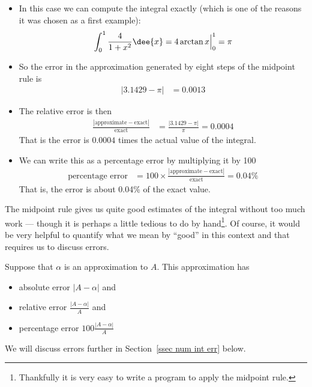 \begin{eg}
\begin{itemize}
\item In this case we can compute the integral exactly (which is one of the reasons it
was chosen as a first example):
\begin{align*}
\int_0^1\frac{4}{1+x^2}\dee{x} =4\arctan x\Big|_0^1 = \pi
\end{align*}

\item So the error in the approximation generated by eight steps of the midpoint
rule is
\begin{align*}
|3.1429-\pi| &=0.0013
\end{align*}
\item The relative error is then
\begin{align*}
  \frac{|\text{approximate}-\text{exact}|}{\text{exact}}
  &= \frac{|3.1429-\pi|}{\pi}=0.0004
\end{align*}
That is the error is $0.0004$ times the actual value of the integral.
\item We can write this as a percentage error by multiplying it by 100
\begin{align*}
  \text{percentage error} &= 100 \times
\frac{|\text{approximate}-\text{exact}|}{\text{exact}}
  = 0.04 \%
\end{align*}
That is, the error is about 0.04\% of the exact value.
\end{itemize}

\end{eg}
The midpoint rule gives us quite good estimates of the integral without too much work
--- though it is perhaps a little tedious to do by hand\footnote{Thankfully it is very
easy to write a program to apply the midpoint rule.}. Of course, it would be very helpful
to quantify what we mean by ``good'' in this context and that requires us to discuss
errors.
\begin{defn}\label{def:errorType}
Suppose that $\alpha$ is an approximation to $A$. This approximation
has
\begin{itemize}
\item absolute error $|A-\alpha|$ and
\item relative error $\frac{|A-\alpha|}{A}$ and
\item percentage error $100\frac{|A-\alpha|}{A}$
\end{itemize}
\end{defn}
We will discuss errors further in Section~\ref{ssec num int err} below.

